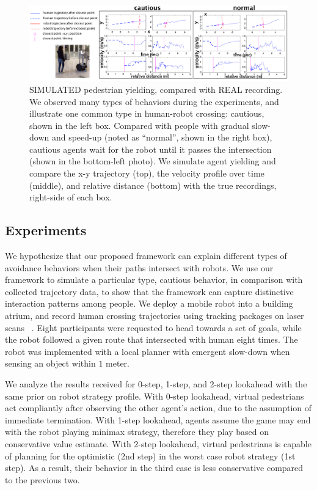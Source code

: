 \documentclass[letterpaper, 10 pt, conference]{ieeeconf}  %
\begin{document}
\begin{figure}[t]
      \vspace{-1em}
      \centering
      \hspace{-5em}
      \vspace{-1em}
      \includegraphics[scale=0.48]{iros_exp}
      \hspace{-5em}
      \caption{SIMULATED pedestrian yielding, compared with REAL recording. We observed many types of behaviors during the experiments, and illustrate one common type in human-robot crossing: cautious, shown in the left box. Compared with people with gradual slow-down and speed-up (noted as ``normal'', shown in the right box), cautious agents wait for the robot until it passes the intersection (shown in the bottom-left photo). We simulate agent yielding and compare the x-y trajectory (top), the velocity profile over time (middle), and relative distance (bottom) with the true recordings, right-side of each box.}
      \vspace{-1.7em}
     \label{fig:cautious_recording}
\end{figure}

\subsection{Experiments}
We hypothesize that our proposed framework can explain different types of avoidance behaviors when their paths intersect with robots. We use our framework to simulate a particular type, cautious behavior, in comparison with collected trajectory data, to show that the framework can capture distinctive interaction patterns among people. We deploy a mobile robot into a building atrium, and record human crossing trajectories using tracking packages on laser scans ~\cite{leigh2015person}. Eight participants were requested to head towards a set of goals, while the robot followed a given route that intersected with human eight times. The robot was implemented with a local planner with emergent slow-down when sensing an object within $1$ meter. 

We analyze the results received for 0-step, 1-step, and 2-step lookahead with the same prior on robot strategy profile. With 0-step lookahead, virtual pedestrians act 
compliantly after observing the other agent's action, due to the assumption of immediate termination. With 1-step lookahead, agents assume the game may end with the robot playing minimax strategy, therefore they play based on conservative value estimate. With 2-step lookahead, virtual pedestrians is capable of planning for the optimistic (2nd step) in the worst case robot strategy (1st step). As a result, their behavior in the third case is less conservative compared to the previous two. 
\end{document}
